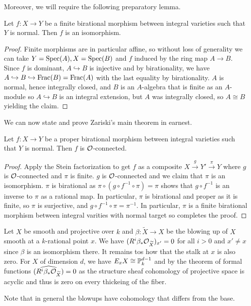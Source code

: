 Moreover, we will require the following preparatory lemma. 
\begin{lemma}\label{lem: birational with normal target is isomorphism}
    Let $f:X\to Y$ be a finite birational morphism between integral varieties such that $Y$ is normal. Then $f$ is an isomorphism. 
\end{lemma}
\begin{proof}
    Finite morphisms are in particular affine, so without loss of generality we can take $Y=\operatorname{Spec}(A),X=\operatorname{Spec}(B)$ and $f$ induced by the ring map $A\to B$. Since $f$ is dominant, $A\hookrightarrow B$ is injective and by birationality, we have $A\hookrightarrow B\hookrightarrow\mathrm{Frac}(B)=\mathrm{Frac}(A)$ with the last equality by birationality. $A$ is normal, hence integrally closed, and $B$ is an $A$-algebra that is finite as an $A$-module so $A\hookrightarrow B$ is an integral extension, but $A$ was integrally closed, so $A\cong B$ yielding the claim. 
\end{proof}
We can now state and prove Zariski's main theorem in earnest. 
\begin{theorem}\label{thm: Zariski main theorem}
    Let $f:X\to Y$ be a proper birational morphism between integral varieties such that $Y$ is normal. Then $f$ is $\mathcal{O}$-connected. 
\end{theorem}
\begin{proof}
    Apply the Stein factorization  to get $f$ as a composite $X\xrightarrow{g}Y'\xrightarrow{\pi}Y$ where $g$ is $\mathcal{O}$-connected and $\pi$ is finite. $g$ is $\mathcal{O}$-connected and we claim that $\pi$ is an isomorphism. $\pi$ is birational as $\pi\circ(g\circ f^{-1}\circ\pi)=\pi$ shows that $g\circ f^{-1}$ is an inverse to $\pi$ as a rational map. In particular, $\pi$ is birational and proper as it is finite, so $\pi$ is surjective, and $g\circ f^{-1}\circ\pi=\pi^{-1}$. In particular, $\pi$ is a finite birational morphism between integral varities with normal target so  completes the proof. 
\end{proof}
\begin{example}
    Let $X$ be smooth and projective over $k$ and $\beta:\widetilde{X}\to X$ be the blowing up of $X$ smooth at a $k$-rational point $x$. We have $(R^{i}\beta_{*}\mathcal{O}_{\widetilde{X}})_{x'}=0$ for all $i>0$ and $x'\neq x$ since $\beta$ is an isomorphism there. It remains tos how that the stalk at $x$ is also zero. For $X$ of dimension $d$, we have $E_{x}X\cong\mathbb{P}^{d-1}_{k}$ and by the theorem of formal functions $\widehat{(R^{i}\beta_{*}\mathcal{O}_{\widetilde{X}})}=0$ as the structure sheaf cohomology of projective space is acyclic and thus is zero on every thickeing of the fiber. 
\end{example}
Note that in general the blowups have cohomology that differs from the base. 

